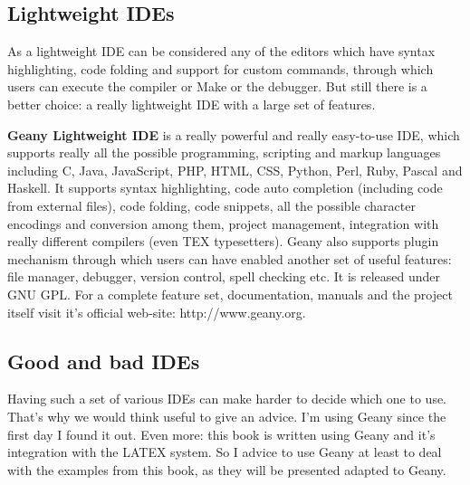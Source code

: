 \subsection{Lightweight IDEs}
As a lightweight IDE can be considered any of the editors which have syntax highlighting, code folding and support for custom commands, through which users can execute the compiler or Make or the debugger. But still there is a better choice: a really lightweight IDE with a large set of features. 

\textbf {Geany Lightweight IDE} is a really powerful and really easy-to-use IDE, which supports really all the possible programming, scripting and markup languages including C, Java, JavaScript, PHP, HTML, CSS, Python, Perl, Ruby, Pascal and Haskell. It supports syntax highlighting, code auto completion (including code from external files), code folding, code snippets, all the possible character encodings and conversion among them, project management, integration with really different compilers (even TEX typesetters). Geany also supports plugin mechanism through which users can have enabled another set of useful features: file manager, debugger, version control, spell checking etc. It is released under GNU GPL. For a complete feature set, documentation, manuals and the project itself visit it's official web-site: http://www.geany.org. 

\subsection{Good and bad IDEs}
Having such a set of various IDEs can make harder to decide which one to use. That's why we would think useful to give an advice. I'm using Geany since the first day I found it out. Even more: this book is written using Geany and it's integration with the LATEX system. So I advice to use Geany at least to deal with the examples from this book, as they will be presented adapted to Geany.


